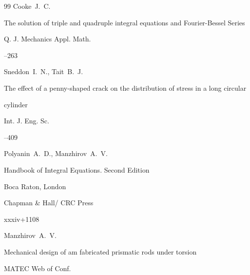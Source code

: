 \begin{thebibliography}{99}
\by Cooke~J.~C.

\paper The solution of triple and quadruple integral equations and Fourier-Bessel Series

\jour Q. J. Mechanics Appl. Math.




--263







\by Sneddon~I.~N., Tait~B.~J.

\paper The effect of a penny-shaped crack on the distribution of stress in a long circular

cylinder

\jour Int. J. Eng. Sc.




--409





\by Polyanin~A.~D., Manzhirov~A.~V.

\book Handbook of Integral Equations. Second Edition

\publaddr Boca Raton, London

\publ Chapman \& Hall/ CRC Press


\totalpages  xxxiv+1108





\by Manzhirov~A.~V.

\paper Mechanical design of am fabricated prismatic rods under torsion

\jour MATEC Web of Conf.







\end{thebibliography}





